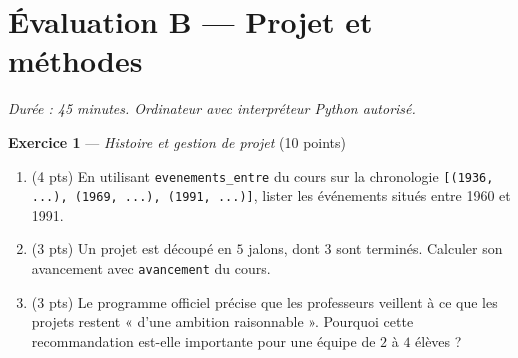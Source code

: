 \section*{Évaluation B --- Projet et méthodes}
\textit{Durée : 45 minutes. Ordinateur avec interpréteur Python autorisé.}


\bigskip

\textbf{Exercice 1} --- \textit{Histoire et gestion de projet} \hfill (10 points)

\begin{enumerate}
  \item (4 pts) En utilisant \lstinline{evenements_entre} du cours sur la chronologie \lstinline{[(1936, ...), (1969, ...), (1991, ...)]}, lister les événements situés entre 1960 et 1991.
  \item (3 pts) Un projet est découpé en $5$ jalons, dont $3$ sont terminés. Calculer son avancement avec \lstinline{avancement} du cours.
  \item (3 pts) Le programme officiel précise que les professeurs veillent à ce que les projets restent « d'une ambition raisonnable ». Pourquoi cette recommandation est-elle importante pour une équipe de $2$ à $4$ élèves ?
\end{enumerate}


